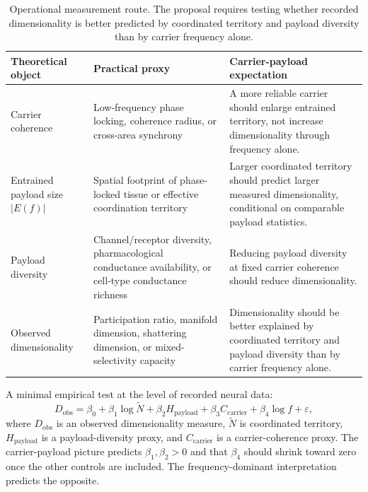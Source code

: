\documentclass[11pt,a4paper]{article}
\theoremstyle{definition}
\theoremstyle{remark}
\begin{document}
\begin{table}[H]
\centering
\small
\begin{tabularx}{\linewidth}{@{}>{\raggedright\arraybackslash}p{3.05cm}YY@{}}
\toprule
Theoretical object & Practical proxy & Carrier-payload expectation \\
\midrule
Carrier coherence & Low-frequency phase locking, coherence radius, or cross-area synchrony & A more reliable carrier should enlarge entrained territory, not increase dimensionality through frequency alone. \\
Entrained payload size $\lvert E(f)\rvert$ & Spatial footprint of phase-locked tissue or effective coordination territory & Larger coordinated territory should predict larger measured dimensionality, conditional on comparable payload statistics. \\
Payload diversity & Channel/receptor diversity, pharmacological conductance availability, or cell-type conductance richness & Reducing payload diversity at fixed carrier coherence should reduce dimensionality. \\
Observed dimensionality & Participation ratio, manifold dimension, shattering dimension, or mixed-selectivity capacity \cite{rigotti2013importance,fusi2016neurons} & Dimensionality should be better explained by coordinated territory and payload diversity than by carrier frequency alone. \\
\bottomrule
\end{tabularx}
\caption{Operational measurement route. The proposal requires testing whether recorded dimensionality is better predicted by coordinated territory and payload diversity than by carrier frequency alone.}
\label{tab:measurement-program}
\end{table}

A minimal empirical test at the level of recorded neural data:
\begin{equation}
\label{eq:empirical-test}
D_{\mathrm{obs}}
=
\beta_0
+\beta_1 \log \widetilde N
+\beta_2 H_{\mathrm{payload}}
+\beta_3 C_{\mathrm{carrier}}
+\beta_4 \log f
+\varepsilon,
\end{equation}
where $D_{\mathrm{obs}}$ is an observed dimensionality measure, $\widetilde N$ is coordinated territory, $H_{\mathrm{payload}}$ is a payload-diversity proxy, and $C_{\mathrm{carrier}}$ is a carrier-coherence proxy. The carrier-payload picture predicts $\beta_1,\beta_2>0$ and that $\beta_4$ should shrink toward zero once the other controls are included. The frequency-dominant interpretation predicts the opposite.
\end{document}
